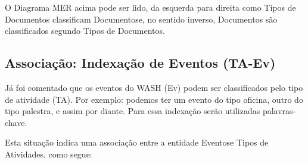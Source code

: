 \documentclass[
12pt,		%
openright,	%
twoside,  %
a4paper,			%
chapter=TITLE,		%
english,			%
french,				%
spanish,			%
brazil				%
]{USPSC-classe/USPSC}
\begin{document}

O Diagrama MER acima pode ser lido, da esquerda para direita como \textquotedbl Tipos de Documentos classificam Documentos\textquotedbl  e, no sentido inverso, \textquotedbl Documentos s\~ao classificados segundo Tipos de Documentos\textquotedbl .









\subsection[Associa\c{c}\~ao: Indexa\c{c}\~ao de Eventos (TA-Ev)]{Associa\c{c}\~ao: Indexa\c{c}\~ao de Eventos (TA-Ev)}\label{Associa\c{c}\~ao: Indexa\c{c}\~ao de Eventos (TA-Ev)}
J\'a foi comentado que os eventos do WASH (Ev) podem ser classificados pelo tipo de atividade (TA). Por exemplo: podemos ter um evento do tipo oficina, outro do tipo palestra, e assim por diante. Para essa indexa\c{c}\~ao ser\~ao utilizadas palavras-chave.









Esta situa\c{c}\~ao indica uma associa\c{c}\~ao entre a entidade \textquotedbl Eventos\textquotedbl  e \textquotedbl Tipos de Atividades\textquotedbl , como segue:










\end{document}
